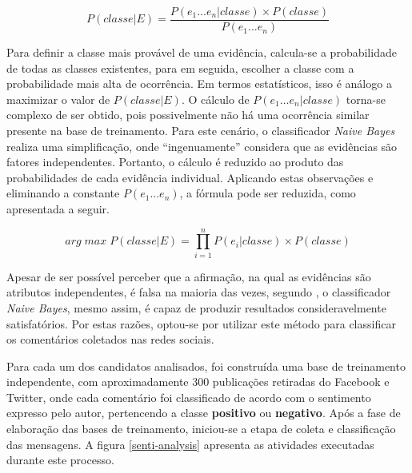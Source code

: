 \begin{equation}
P(classe | E) = \frac{P(e_{1} ... e_{n} | classe) \times P(classe)}{P(e_{1} ... e_{n})}
\end{equation}

Para definir a classe mais provável de uma evidência, calcula-se a probabilidade de todas as classes existentes, para em seguida, escolher a classe com a probabilidade mais alta de ocorrência. Em termos estatísticos, isso é análogo a maximizar o valor de $P(classe | E)$. O cálculo de $P(e_{1} … e_{n} | classe)$ torna-se complexo de ser obtido, pois possivelmente não há uma ocorrência similar presente na base de treinamento. Para este cenário, o classificador \textit{Naive Bayes} realiza uma simplificação, onde “ingenuamente” considera que as evidências são fatores independentes. Portanto, o cálculo é reduzido ao produto das probabilidades de cada evidência individual. Aplicando estas observações e eliminando a constante $P(e_{1} … e_{n})$, a fórmula pode ser reduzida, como apresentada a seguir.

\begin{equation}
arg\;max\;P(classe | E) = \prod_{i=1}^{n} P(e_{i} | classe) \times P(classe)
\end{equation}

Apesar de ser possível perceber que a afirmação, na qual as evidências são atributos independentes, é falsa na maioria das vezes, segundo , o classificador \textit{Naive Bayes}, mesmo assim, é capaz de produzir resultados consideravelmente satisfatórios. Por estas razões, optou-se por utilizar este método para classificar os comentários coletados nas redes sociais.

Para cada um dos candidatos analisados, foi construída uma base de treinamento independente, com aproximadamente 300 publicações retiradas do Facebook e Twitter, onde cada comentário foi classificado de acordo com o sentimento expresso pelo autor, pertencendo a classe \textbf{positivo} ou \textbf{negativo}. Após a fase de elaboração das bases de treinamento, iniciou-se a etapa de coleta e classificação das mensagens. A figura \ref{senti-analysis} apresenta as atividades executadas durante este processo.

